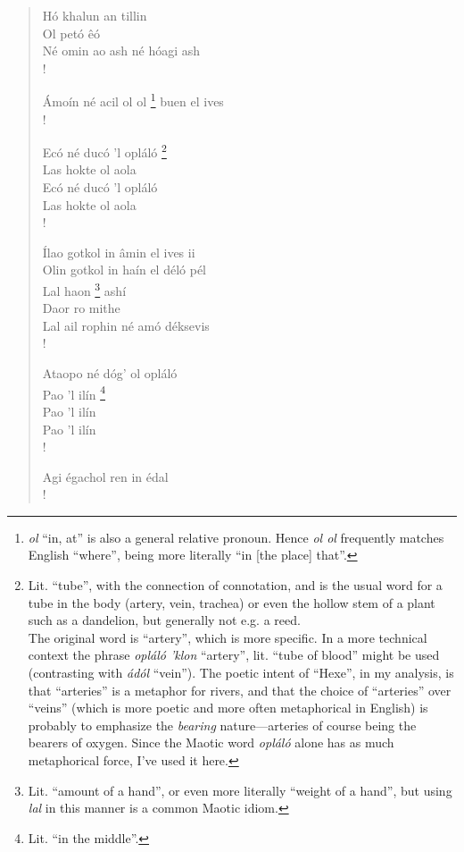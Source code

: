 \documentclass{article}
\let\oldthefootnote\thefootnote
\newcommand\oocfootnote[2][DarkGreen]{\renewcommand\thefootnote{\color{#1}\oldthefootnote}%
  \footnote{\color{#1}#2}%
  \renewcommand{\thefootnote}{\oldthefootnote}}
\begin{document}
\begin{verse}
Hó khalun an tillin \\
Ol petó êó \\
Né omin ao ash né hóagi ash \\!

Ámoín né acil ol ol\oocfootnote{\emph{ol} ``in, at'' is also a general relative pronoun. Hence \emph{ol ol} frequently matches English ``where'', being more literally ``in [the place] that''.} buen el ives \\!

Ecó né ducó 'l opláló\oocfootnote{Lit. ``tube'', with the connection of connotation, and is the usual word for a tube in the body (artery, vein, trachea) or even the hollow stem of a plant such as a dandelion, but generally not e.g. a reed. \\ The original word is ``artery'', which is more specific. In a more technical context the phrase \emph{opláló 'klon} ``artery'', lit. ``tube of blood'' might be used (contrasting with \emph{ádól} ``vein''). The poetic intent of ``Hexe'', in my analysis, is that ``arteries'' is a metaphor for rivers, and that the choice of ``arteries'' over ``veins'' (which is more poetic and more often metaphorical in English) is probably to emphasize the \emph{bearing} nature—arteries of course being the bearers of oxygen. Since the Maotic word \emph{opláló} alone has as much metaphorical force, I've used it here. } \\
Las hokte ol aola \\
Ecó né ducó 'l opláló \\
Las hokte ol aola \\!

Ílao gotkol in âmin el ives ii \\
Olin gotkol in haín el déló pél \\
Lal haon\oocfootnote{Lit. ``amount of a hand'', or even more literally ``weight of a hand'', but using \emph{lal} in this manner is a common Maotic idiom.} ashí \\
Daor ro mithe \\
Lal ail rophin né amó déksevis \\!

Ataopo né dóg' ol opláló \\
Pao 'l ilín\oocfootnote{Lit. ``in the middle''.} \\
Pao 'l ilín \\
Pao 'l ilín \\!

Agi égachol ren in édal \\!


\end{verse}
\end{document}
